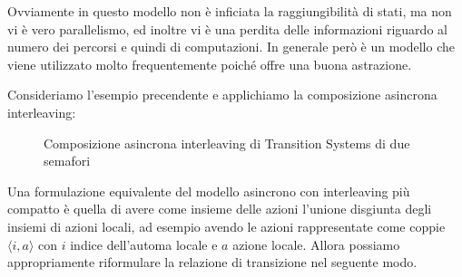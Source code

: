 Ovviamente in questo modello non è inficiata la raggiungibilità di stati, ma non vi è vero parallelismo, ed inoltre vi è una perdita delle informazioni riguardo al numero dei percorsi e quindi di computazioni. In generale però è un modello che viene utilizzato molto frequentemente poiché offre una buona astrazione.

Consideriamo l'esempio precendente e applichiamo la composizione asincrona interleaving:

\begin{figure}[H]
  \centering
  \caption{Composizione asincrona interleaving di Transition Systems di due semafori}\label{fig:ts_semaphore_async_composition}
\end{figure}


Una formulazione equivalente del modello asincrono con interleaving più compatto è quella di avere come insieme delle azioni l'unione disgiunta degli insiemi di azioni locali, ad esempio avendo le azioni rappresentate come coppie \(\langle i,a\rangle\) con \(i\) indice dell'automa locale e \(a\) azione locale. Allora possiamo appropriamente riformulare la relazione di transizione nel seguente modo.

